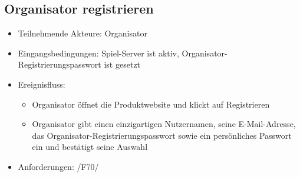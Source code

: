 \documentclass[a4paper]{scrreprt}
\begin{document}

    \subsection{Organisator registrieren}
    \begin{itemize}
        \item Teilnehmende Akteure: \Gls{Organisator}
        \item Eingangsbedingungen: \Gls{Spiel-Server} ist aktiv, Organisator-Registrierungspasswort ist gesetzt
        \item Ereignisfluss:
        \begin{itemize}
            \item \Gls{Organisator} öffnet die Produktwebsite und klickt auf Registrieren
            \item \Gls{Organisator} gibt einen einzigartigen Nutzernamen, seine E-Mail-Adresse, das Organisator-Registrierungspasswort sowie ein persönliches Passwort ein und bestätigt seine Auswahl
        \end{itemize}
        \item Anforderungen: /F70/
    \end{itemize}
\end{document}
